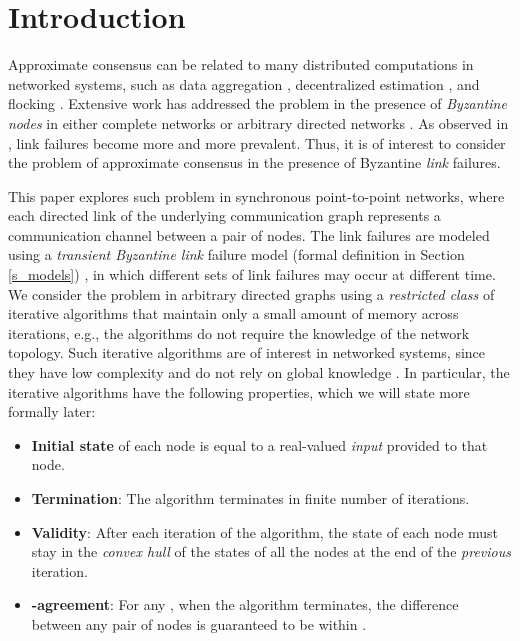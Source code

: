 \documentclass{llncs}
\begin{document}
\section{Introduction}
\label{s_intro}
Approximate consensus can be related to many distributed computations in networked systems, such as data aggregation \cite{Kempe_gossip}, decentralized estimation  \cite{noisy_link}, and flocking \cite{Jadbabaie}. Extensive work has addressed the problem in the presence of {\em Byzantine nodes} \cite{psl_BG_1982} in either complete networks \cite{AA_Dolev_1986,AA_optimal} or arbitrary directed networks \cite{vaidya_PODC12,Sundaram_condition,Tseng_general}. As observed in \cite{Biely_hybrid,Schmid_link}, link failures become more and more prevalent. Thus, it is of interest to consider the problem of approximate consensus in the presence of Byzantine {\em link} failures.

This paper explores such problem in synchronous point-to-point networks, where each directed link of the underlying communication graph represents a communication channel between a pair of nodes. The link failures are modeled using a {\em transient Byzantine link} failure model (formal definition in Section \ref{s_models}) \cite{Santoro_link,Santoro_link2}, in which different sets of link failures may occur at different time. We consider the problem in arbitrary directed graphs using a {\em restricted class} of iterative algorithms that maintain only a small amount of memory across iterations, e.g., the algorithms do not require the knowledge of the network topology. Such iterative algorithms are of interest in networked systems, since they have low complexity and do not rely on global knowledge \cite{Sundaram_condition}. In particular, the iterative algorithms have the following properties, which we will state more formally later:

\begin{itemize}
\item {\bf Initial state} of each node is equal to a real-valued {\em input} provided to that node.

\item {\bf Termination}: The algorithm terminates in finite number of iterations.

\item {\bf Validity}: After each iteration of the algorithm, the state of each node must stay in the {\em convex hull} of the states of all the nodes at the end of the {\em previous} iteration.

\item {\bf -agreement}: For any , when the algorithm terminates, the difference between any pair of nodes is guaranteed to be within .
\end{itemize}
\end{document}

